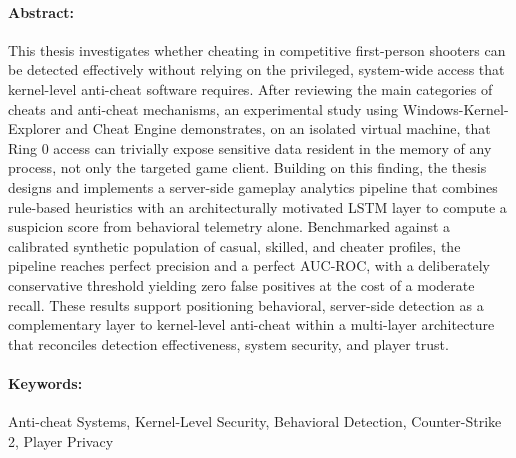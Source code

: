 \newpage
\pagestyle{empty}




\paragraph{\color{colorEPISEN-MEMOIRE}Abstract:}
\begin{small}

This thesis investigates whether cheating in competitive first-person shooters can be detected effectively without relying on the privileged, system-wide access that kernel-level anti-cheat software requires. After reviewing the main categories of cheats and anti-cheat mechanisms, an experimental study using Windows-Kernel-Explorer and Cheat Engine demonstrates, on an isolated virtual machine, that Ring 0 access can trivially expose sensitive data resident in the memory of any process, not only the targeted game client. Building on this finding, the thesis designs and implements a server-side gameplay analytics pipeline that combines rule-based heuristics with an architecturally motivated LSTM layer to compute a suspicion score from behavioral telemetry alone. Benchmarked against a calibrated synthetic population of casual, skilled, and cheater profiles, the pipeline reaches perfect precision and a perfect AUC-ROC, with a deliberately conservative threshold yielding zero false positives at the cost of a moderate recall. These results support positioning behavioral, server-side detection as a complementary layer to kernel-level anti-cheat within a multi-layer architecture that reconciles detection effectiveness, system security, and player trust.

\end{small}
\vspace*{-5mm}

\paragraph{\color{colorEPISEN-MEMOIRE}Keywords:}
\begin{small}
Anti-cheat Systems, Kernel-Level Security, Behavioral Detection, Counter-Strike 2, Player Privacy
\end{small}
